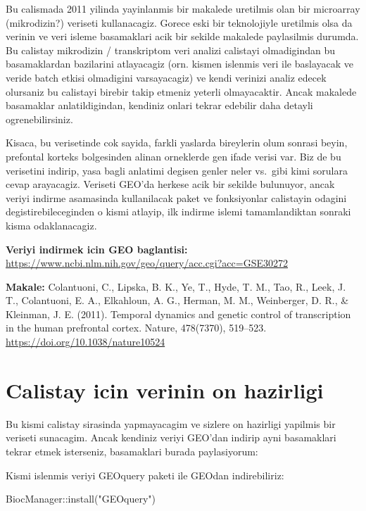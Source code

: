 \documentclass[
]{book}
\newenvironment{Shaded}{\begin{snugshade}}{\end{snugshade}}
\newcommand{\FunctionTok}[1]{\textcolor[rgb]{0.00,0.00,0.00}{#1}}
\newcommand{\NormalTok}[1]{#1}
\newcommand{\SpecialCharTok}[1]{\textcolor[rgb]{0.00,0.00,0.00}{#1}}
\newcommand{\StringTok}[1]{\textcolor[rgb]{0.31,0.60,0.02}{#1}}
\begin{document}
Bu calismada 2011 yilinda yayinlanmis bir makalede uretilmis olan bir microarray (mikrodizin?) veriseti kullanacagiz. Gorece eski bir teknolojiyle uretilmis olsa da verinin ve veri isleme basamaklari acik bir sekilde makalede paylasilmis durumda. Bu calistay mikrodizin / transkriptom veri analizi calistayi olmadigindan bu basamaklardan bazilarini atlayacagiz (orn. kismen islenmis veri ile baslayacak ve veride batch etkisi olmadigini varsayacagiz) ve kendi verinizi analiz edecek olursaniz bu calistayi birebir takip etmeniz yeterli olmayacaktir. Ancak makalede basamaklar anlatildigindan, kendiniz onlari tekrar edebilir daha detayli ogrenebilirsiniz.

Kisaca, bu verisetinde cok sayida, farkli yaslarda bireylerin olum sonrasi beyin, prefontal korteks bolgesinden alinan orneklerde gen ifade verisi var. Biz de bu verisetini indirip, yasa bagli anlatimi degisen genler neler vs.~gibi kimi sorulara cevap arayacagiz. Veriseti GEO'da herkese acik bir sekilde bulunuyor, ancak veriyi indirme asamasinda kullanilacak paket ve fonksiyonlar calistayin odagini degistirebileceginden o kismi atlayip, ilk indirme islemi tamamlandiktan sonraki kisma odaklanacagiz.

\textbf{Veriyi indirmek icin GEO baglantisi:} \url{https://www.ncbi.nlm.nih.gov/geo/query/acc.cgi?acc=GSE30272}

\textbf{Makale:} Colantuoni, C., Lipska, B. K., Ye, T., Hyde, T. M., Tao, R., Leek, J. T., Colantuoni, E. A., Elkahloun, A. G., Herman, M. M., Weinberger, D. R., \& Kleinman, J. E. (2011). Temporal dynamics and genetic control of transcription in the human prefrontal cortex. Nature, 478(7370), 519--523. \url{https://doi.org/10.1038/nature10524}

\hypertarget{calistay-icin-verinin-on-hazirligi}{%
\section{Calistay icin verinin on hazirligi}\label{calistay-icin-verinin-on-hazirligi}}

Bu kismi calistay sirasinda yapmayacagim ve sizlere on hazirligi yapilmis bir veriseti sunacagim. Ancak kendiniz veriyi GEO'dan indirip ayni basamaklari tekrar etmek isterseniz, basamaklari burada paylasiyorum:

Kismi islenmis veriyi GEOquery paketi ile GEOdan indirebiliriz:

\begin{Shaded}
\begin{Highlighting}[]
\NormalTok{BiocManager}\SpecialCharTok{::}\FunctionTok{install}\NormalTok{(}\StringTok{"GEOquery"}\NormalTok{)}
\end{Highlighting}
\end{Shaded}
\end{document}
